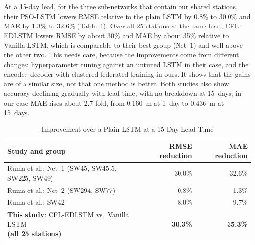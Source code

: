At a 15-day lead, for the three sub-networks that contain our shared stations,
their PSO-LSTM lowers RMSE relative to the plain LSTM by 0.8\% to 30.0\% and MAE
by 1.3\% to 32.6\% (Table~\ref{tab:4.ruma-gain}). Over all 25 stations at the
same lead, CFL-EDLSTM lowers RMSE by about 30\% and MAE by about 35\% relative to
Vanilla LSTM, which is comparable to their best group (Net~1) and well above the
other two. This needs care, because the improvements come from different
changes: hyperparameter tuning against an untuned LSTM in their case, and the
encoder--decoder with clustered federated training in ours. It shows that the
gains are of a similar size, not that one method is better. Both studies also
show accuracy declining gradually with lead time, with no breakdown at 15~days;
in our case MAE rises about 2.7-fold, from 0.160~m at 1~day to 0.436~m at
15~days.


\begin{table}[htbp]
    \centering
    \caption{Improvement over a Plain LSTM at a 15-Day Lead Time}
    \label{tab:4.ruma-gain}
    \small
    \renewcommand{\arraystretch}{1.15}
    \begin{tabular}{@{}l r r@{}}
        \toprule
        \textbf{Study and group} & \textbf{RMSE reduction} & \textbf{MAE reduction} \\
        \midrule
        Ruma et al.: Net~1 (SW45, SW45.5, SW225, SW49) & 30.0\% & 32.6\% \\
        Ruma et al.: Net~2 (SW294, SW77) & 0.8\% & 1.3\% \\
        Ruma et al.: SW42 & 8.0\% & 9.7\% \\
        \rowcolor{gray!15}
        \makecell[l]{\textbf{This study}: CFL-EDLSTM vs.\ Vanilla LSTM\\
        \textbf{(all 25 stations)}} & \textbf{30.3\%} & \textbf{35.3\%} \\
        \bottomrule
    \end{tabular}
\end{table}

